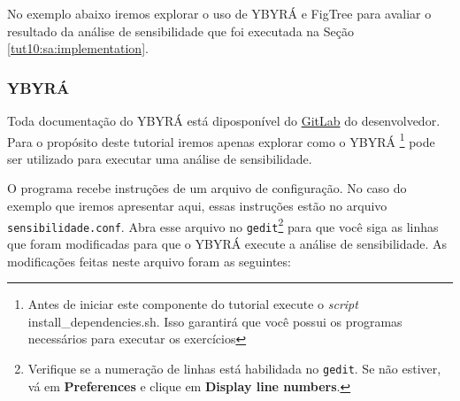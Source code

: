 \begin{refsection}

No exemplo abaixo iremos explorar o uso de YBYRÁ e FigTree para avaliar o resultado da análise de sensibilidade que foi executada na Seção \ref{tut10:sa:implementation}.

\subsubsection{YBYRÁ}\label{tut10:sa:evaluation:ybyra}

Toda documentação do YBYRÁ está diposponível do \href{https://gitlab.com/MachadoDJ/ybyra}{GitLab} do desenvolvedor. Para o propósito deste tutorial iremos apenas explorar como o YBYRÁ \footnote{Antes de iniciar este componente do tutorial execute o \textit{script} install\_dependencies.sh. Isso garantirá que você possui os programas necessários para executar os exercícios} pode ser utilizado para executar uma análise de sensibilidade.

O programa recebe instruções de um arquivo de configuração. No caso do exemplo que iremos apresentar aqui, essas instruções estão no arquivo \texttt{sensibilidade.conf}. Abra esse arquivo no \texttt{gedit}\footnote{Verifique se a numeração de linhas está habilidada no \texttt{gedit}. Se não estiver, vá em \textbf{Preferences} e clique em \textbf{Display line numbers}.} para que você siga as linhas que foram modificadas para que o YBYRÁ execute a análise de sensibilidade. As modificações feitas neste arquivo foram as seguintes:


\end{refsection}
